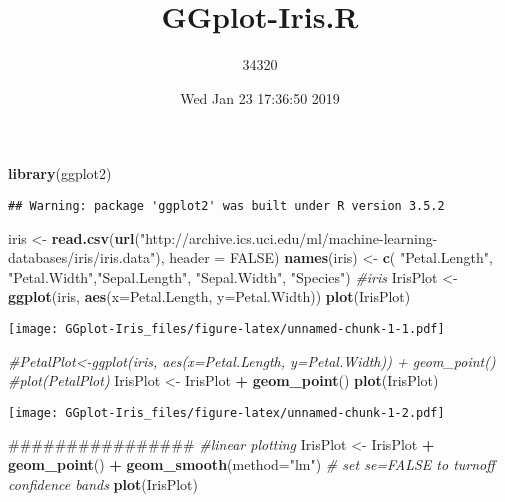 \documentclass[]{article}
\title{GGplot-Iris.R}
\author{34320}
\date{Wed Jan 23 17:36:50 2019}
\newenvironment{Shaded}{\begin{snugshade}}{\end{snugshade}}
\newcommand{\KeywordTok}[1]{\textcolor[rgb]{0.13,0.29,0.53}{\textbf{#1}}}
\newcommand{\DataTypeTok}[1]{\textcolor[rgb]{0.13,0.29,0.53}{#1}}
\newcommand{\StringTok}[1]{\textcolor[rgb]{0.31,0.60,0.02}{#1}}
\newcommand{\CommentTok}[1]{\textcolor[rgb]{0.56,0.35,0.01}{\textit{#1}}}
\newcommand{\OtherTok}[1]{\textcolor[rgb]{0.56,0.35,0.01}{#1}}
\newcommand{\OperatorTok}[1]{\textcolor[rgb]{0.81,0.36,0.00}{\textbf{#1}}}
\newcommand{\NormalTok}[1]{#1}
\begin{document}
\maketitle

\begin{Shaded}
\begin{Highlighting}[]
\KeywordTok{library}\NormalTok{(ggplot2)}
\end{Highlighting}
\end{Shaded}

\begin{verbatim}
## Warning: package 'ggplot2' was built under R version 3.5.2
\end{verbatim}

\begin{Shaded}
\begin{Highlighting}[]
\NormalTok{iris <-}\StringTok{ }\KeywordTok{read.csv}\NormalTok{(}\KeywordTok{url}\NormalTok{(}\StringTok{"http://archive.ics.uci.edu/ml/machine-learning-databases/iris/iris.data"}\NormalTok{), }\DataTypeTok{header =} \OtherTok{FALSE}\NormalTok{)}
\KeywordTok{names}\NormalTok{(iris) <-}\StringTok{ }\KeywordTok{c}\NormalTok{( }\StringTok{"Petal.Length"}\NormalTok{, }\StringTok{"Petal.Width"}\NormalTok{,}\StringTok{"Sepal.Length"}\NormalTok{, }\StringTok{"Sepal.Width"}\NormalTok{, }\StringTok{"Species"}\NormalTok{)}
\CommentTok{#iris}
\NormalTok{IrisPlot <-}\KeywordTok{ggplot}\NormalTok{(iris, }\KeywordTok{aes}\NormalTok{(}\DataTypeTok{x=}\NormalTok{Petal.Length, }\DataTypeTok{y=}\NormalTok{Petal.Width))}
\KeywordTok{plot}\NormalTok{(IrisPlot)}
\end{Highlighting}
\end{Shaded}

\texttt{[image: GGplot-Iris\_files/figure-latex/unnamed-chunk-1-1.pdf]}

\begin{Shaded}
\begin{Highlighting}[]
\CommentTok{#PetalPlot<-ggplot(iris, aes(x=Petal.Length, y=Petal.Width)) + geom_point()}
\CommentTok{#plot(PetalPlot)}
\NormalTok{IrisPlot <-}\StringTok{ }\NormalTok{IrisPlot }\OperatorTok{+}\StringTok{  }\KeywordTok{geom_point}\NormalTok{()}
\KeywordTok{plot}\NormalTok{(IrisPlot)}
\end{Highlighting}
\end{Shaded}

\texttt{[image: GGplot-Iris\_files/figure-latex/unnamed-chunk-1-2.pdf]}

\begin{Shaded}
\begin{Highlighting}[]
\NormalTok{################}
\CommentTok{#linear plotting}
\NormalTok{IrisPlot <-}\StringTok{ }\NormalTok{IrisPlot }\OperatorTok{+}\StringTok{  }\KeywordTok{geom_point}\NormalTok{() }\OperatorTok{+}\StringTok{  }\KeywordTok{geom_smooth}\NormalTok{(}\DataTypeTok{method=}\StringTok{"lm"}\NormalTok{)  }\CommentTok{# set se=FALSE to turnoff confidence bands}
\KeywordTok{plot}\NormalTok{(IrisPlot)}
\end{Highlighting}
\end{Shaded}
\end{document}
